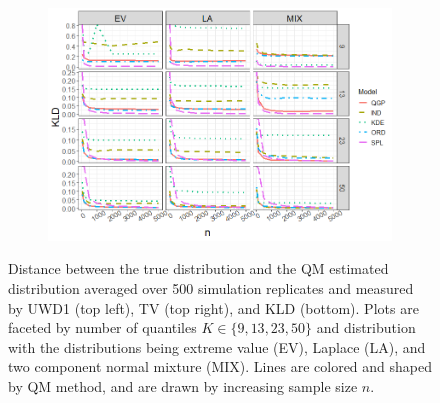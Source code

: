 \documentclass[preprint,12pt,authoryear]{elsarticle}
\begin{document}
\begin{figure}[ht!]
\medskip %
\begin{subfigure}{.53\linewidth}
  \includegraphics[width=\linewidth]{Images/uk_kld.png}
\end{subfigure}\hfill %
\tiny
\caption{Distance between the true distribution and the QM estimated distribution averaged over 500 simulation replicates and measured by UWD1 (top left), TV (top right), and KLD (bottom). Plots are faceted by number of quantiles $K \in \{9, 13, 23, 50\}$ and distribution with the distributions being extreme value (EV), Laplace (LA), and two component normal mixture (MIX). Lines are colored and shaped by QM method, and are drawn by increasing sample size $n$.}
\label{fig:uk_dists}
\end{figure}

\end{document}
